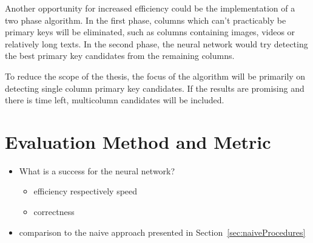 \documentclass[a4paper]{article}
\begin{document}
Another opportunity for increased efficiency could be the implementation of a two phase algorithm. In the first phase, columns which can't practicably be primary keys will be eliminated, such as columns containing images, videos or relatively long texts. In the second phase, the neural network would try detecting the best primary key candidates from the remaining columns.

To reduce the scope of the thesis, the focus of the algorithm will be primarily on detecting single column primary key candidates. If the results are promising and there is time left, multicolumn candidates will be included.

\section{Evaluation Method and Metric}
\begin{itemize}
  \item What is a success for the neural network?
        \begin{itemize}[label=\(\rightarrow \)]
          \item efficiency respectively speed
          \item correctness
        \end{itemize}
  \item comparison to the naive approach presented in Section~\ref{sec:naiveProcedures}
\end{itemize}
\end{document}
